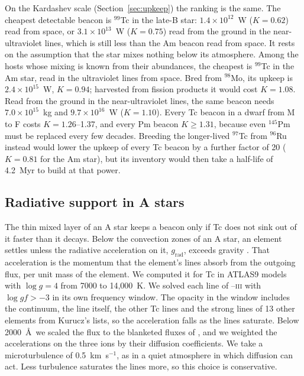 \documentclass[final,5p]{elsarticle}
\begin{document}
On the Kardashev scale (Section~\ref{sec:upkeep}) the ranking is the same. The cheapest detectable beacon is $^{99}$Tc in the late-B star: $1.4\times10^{12}$~W ($K = 0.62$) read from space, or $3.1\times10^{13}$~W ($K = 0.75$) read from the ground in the near-ultraviolet  lines, which is still less than the Am beacon read from space. It rests on the assumption that the star mixes nothing below its atmosphere. Among the hosts whose mixing is known from their abundances, the cheapest is $^{99}$Tc in the Am star, read in the  ultraviolet lines from space. Bred from $^{98}$Mo, its upkeep is $2.4\times10^{15}$~W, $K = 0.94$; harvested from fission products it would cost $K = 1.08$. Read from the ground in the near-ultraviolet  lines, the same beacon needs $7.0\times10^{15}$~kg and $9.7\times10^{16}$~W ($K = 1.10$). Every Tc beacon in a dwarf from M to F costs $K = 1.26$--1.37, and every Pm beacon $K \geq 1.31$, because even $^{145}$Pm must be replaced every few decades. Breeding the longer-lived $^{97}$Tc from $^{96}$Ru instead would lower the upkeep of every Tc beacon by a further factor of 20 ($K = 0.81$ for the Am star), but its inventory would then take a half-life of 4.2~Myr to build at that power.

\subsection{Radiative support in A stars}
\label{sec:levitation}

The thin mixed layer of an A star keeps a beacon only if Tc does not sink out of it faster than it decays. Below the convection zones of an A star, an element settles unless the radiative acceleration on it, $g_\mathrm{rad}$, exceeds gravity \citep{Richer2000}. That acceleration is the momentum that the element's lines absorb from the outgoing flux, per unit mass of the element. We computed it for Tc in ATLAS9 models with $\log g = 4$ from 7000 to 14{,}000~K. We solved each line of --\textsc{iii} with $\log gf > -3$ in its own frequency window. The opacity in the window includes the continuum, the line itself, the other Tc lines and the strong lines of 13 other elements from Kurucz's lists, so the acceleration falls as the lines saturate. Below 2000~\AA\ we scaled the flux to the blanketed fluxes of \citet{CastelliKurucz2003}, and we weighted the accelerations on the three ions by their diffusion coefficients. We take a microturbulence of 0.5~km~s$^{-1}$, as in a quiet atmosphere in which diffusion can act. Less turbulence saturates the lines more, so this choice is conservative.
\end{document}
